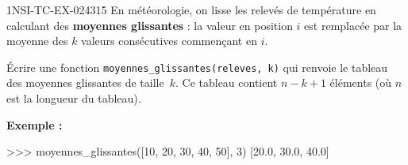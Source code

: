 \begin{exercice}{1NSI-TC-EX-024}{3}{15}
En météorologie, on lisse les relevés de température en calculant des
\textbf{moyennes glissantes} : la valeur en position $i$ est remplacée par la
moyenne des $k$ valeurs consécutives commençant en $i$.

Écrire une fonction \texttt{moyennes\_glissantes(releves,~k)}
qui renvoie le tableau des moyennes glissantes de taille~$k$.
Ce tableau contient $n - k + 1$ éléments (où $n$ est la longueur du tableau).

\textbf{Exemple :}
\begin{console}
>>> moyennes_glissantes([10, 20, 30, 40, 50], 3)
[20.0, 30.0, 40.0]
\end{console}
\end{exercice}
